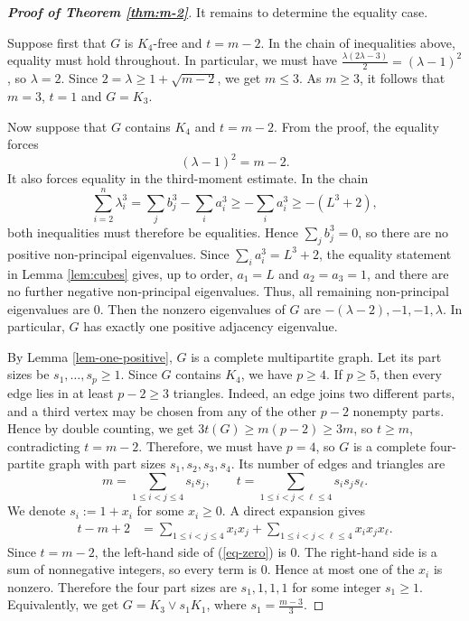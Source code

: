 \documentclass[10pt,a4paper]{amsart}
\renewcommand{\le}{\leqslant}
\renewcommand{\ge}{\geqslant}
\begin{document}
\begin{proof}[{\bf Proof of Theorem \ref{thm:m-2}}]
\smallskip 
It remains to determine the equality case.  

Suppose first that $G$ is
$K_4$-free and $t=m-2$.  In the chain of inequalities above, equality must hold
throughout.  In particular,
we must have $   \frac{\lambda(2\lambda-3)}{2}=(\lambda-1)^2$, 
so $\lambda=2$.  Since
$  2=\lambda\ge 1+\sqrt{m-2}$, 
we get $m\le 3$.  As $m\ge 3$, it follows that $m=3$, $t=1$ and $G=K_3$.

Now suppose that $G$ contains $K_4$ and $t=m-2$.  From the proof, the equality forces
\[
        (\lambda-1)^2=m-2. 
\]
It also forces equality in the third-moment estimate.  In the chain
\[
        \sum_{i=2}^n\lambda_i^3
        =
        \sum_j b_j^3-\sum_i a_i^3
        \ge
        -\sum_i a_i^3
        \ge
        -(L^3+2),
\]
both inequalities must therefore be equalities.  Hence $ \sum_j b_j^3=0$, 
so there are no positive non-principal eigenvalues.  Since $ \sum_i a_i^3=L^3+2$,  
 the equality statement in Lemma \ref{lem:cubes} gives, up to order,  
$ a_1=L$ and $a_2=a_3=1$, 
and there are no further negative non-principal eigenvalues. Thus, all
remaining non-principal eigenvalues are $0$.  Then the nonzero eigenvalues
of $G$ are $-(\lambda-2), -1,-1,\lambda$.  
In particular, $G$ has exactly one positive adjacency eigenvalue.

By Lemma \ref{lem-one-positive}, 
$G$ is a complete multipartite graph.  Let its part sizes be $  s_1,\dots,s_p \ge 1$. 
Since $G$ contains $K_4$, we have $p\ge 4$. 
If $p\ge 5$, then every edge lies in at least $p-2\ge 3$ triangles. Indeed, an
edge joins two different parts, and a third vertex may be chosen from any of
the other $p-2$ nonempty parts.  Hence
by double counting, we get $3t(G)\ge m(p-2)\ge 3m$, so $t\ge m$, contradicting $t=m-2$.  Therefore, we must have $p=4$, so $G$ is a complete four-partite graph
with part sizes $s_1,s_2,s_3,s_4$.  Its number of edges and triangles are
\[
        m=\sum_{1\le i<j\le 4}s_is_j,
        \qquad
        t=\sum_{1\le i<j<\ell\le 4}s_is_js_\ell.
\]
We denote $ s_i:=1+x_i$ for some $ x_i\ge 0$. 
A direct expansion gives
\begin{equation} \label{eq-zero}
\begin{aligned}
        t-m+2
        &=
        \sum_{1\le i<j\le 4}x_ix_j
        +
        \sum_{1\le i<j<\ell\le 4}x_ix_jx_\ell .
\end{aligned}
\end{equation}
Since $t=m-2$, the left-hand side of (\ref{eq-zero}) is $0$.  The right-hand side is a sum
of nonnegative integers, so every term is $0$.  Hence at most one of the
$x_i$ is nonzero.  Therefore the four part sizes are $s_1,1,1,1$ 
for some integer $s_1\ge 1$.  Equivalently, we get $G= K_3\vee s_1K_1$, where $s_1=\frac{m-3}{3}$. 
\end{proof}
\end{document}
